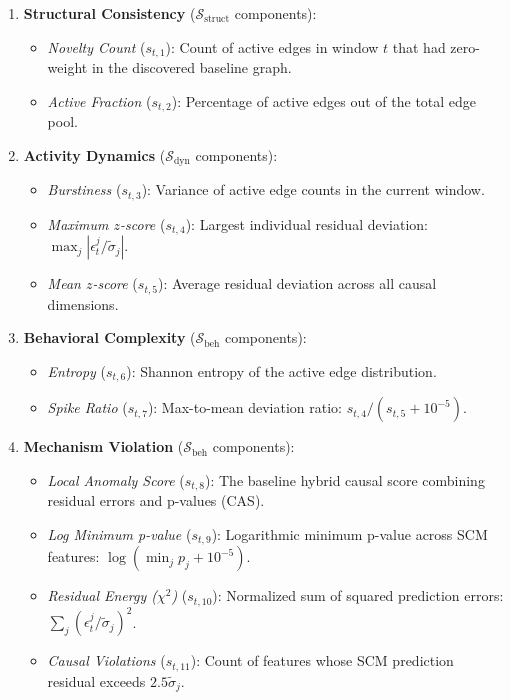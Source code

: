 \begin{enumerate}
\item \textbf{Structural Consistency} ($\mathcal{S}_{\text{struct}}$ components):
\begin{itemize}
\item \textit{Novelty Count} ($s_{t,1}$): Count of active edges in window $t$ that had zero-weight in the discovered baseline graph.
\item \textit{Active Fraction} ($s_{t,2}$): Percentage of active edges out of the total edge pool.
\end{itemize}
\item \textbf{Activity Dynamics} ($\mathcal{S}_{\text{dyn}}$ components):
\begin{itemize}
\item \textit{Burstiness} ($s_{t,3}$): Variance of active edge counts in the current window.
\item \textit{Maximum $z$-score} ($s_{t,4}$): Largest individual residual deviation: $\max_j |\epsilon^j_t / \tilde{\sigma}_j|$.
\item \textit{Mean $z$-score} ($s_{t,5}$): Average residual deviation across all causal dimensions.
\end{itemize}
\item \textbf{Behavioral Complexity} ($\mathcal{S}_{\text{beh}}$ components):
\begin{itemize}
\item \textit{Entropy} ($s_{t,6}$): Shannon entropy of the active edge distribution.
\item \textit{Spike Ratio} ($s_{t,7}$): Max-to-mean deviation ratio: $s_{t,4} / (s_{t,5} + 10^{-5})$.
\end{itemize}
\item \textbf{Mechanism Violation} ($\mathcal{S}_{\text{beh}}$ components):
\begin{itemize}
\item \textit{Local Anomaly Score} ($s_{t,8}$): The baseline hybrid causal score combining residual errors and p-values (CAS).
\item \textit{Log Minimum p-value} ($s_{t,9}$): Logarithmic minimum p-value across SCM features: $\log(\min_j p_j + 10^{-5})$.
\item \textit{Residual Energy ($\chi^2$)} ($s_{t,10}$): Normalized sum of squared prediction errors: $\sum_j (\epsilon^j_t / \tilde{\sigma}_j)^2$.
\item \textit{Causal Violations} ($s_{t,11}$): Count of features whose SCM prediction residual exceeds $2.5\tilde{\sigma}_j$.

\end{itemize}
\end{enumerate}
